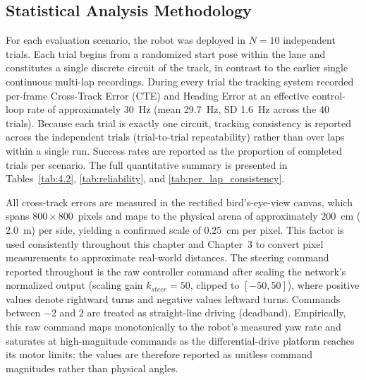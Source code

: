 \FloatBarrier

\subsection{Statistical Analysis Methodology}
For each evaluation scenario, the robot was deployed in $N=10$ independent trials. Each trial begins from a randomized start pose within the lane and constitutes a single discrete circuit of the track, in contrast to the earlier single continuous multi-lap recordings. During every trial the tracking system recorded per-frame Cross-Track Error (CTE) and Heading Error at an effective control-loop rate of approximately 30~Hz (mean 29.7~Hz, SD 1.6~Hz across the 40 trials). Because each trial is exactly one circuit, tracking consistency is reported across the independent trials (trial-to-trial repeatability) rather than over laps within a single run. Success rates are reported as the proportion of completed trials per scenario. The full quantitative summary is presented in Tables~\ref{tab:4.2}, \ref{tab:reliability}, and \ref{tab:per_lap_consistency}.

All cross-track errors are measured in the rectified bird's-eye-view canvas, which spans $800 \times 800$~pixels and maps to the physical arena of approximately $200$~cm ($2.0$~m) per side, yielding a confirmed scale of $0.25$~cm per pixel. This factor is used consistently throughout this chapter and Chapter~3 to convert pixel measurements to approximate real-world distances. The steering command reported throughout is the raw controller command after scaling the network's normalized output (scaling gain $k_{steer}=50$, clipped to $[-50,50]$), where positive values denote rightward turns and negative values leftward turns. Commands between $-2$ and $2$ are treated as straight-line driving (deadband). Empirically, this raw command maps monotonically to the robot's measured yaw rate and saturates at high-magnitude commands as the differential-drive platform reaches its motor limits; the values are therefore reported as unitless command magnitudes rather than physical angles.

